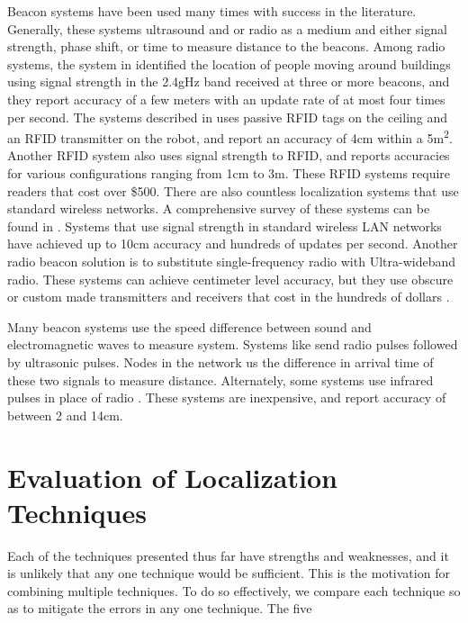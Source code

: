 \documentclass{article}
\begin{document}
Beacon systems have been used many times with success in the literature. Generally, these systems ultrasound and or radio as a medium and either signal strength, phase shift, or time to measure distance to the beacons. Among radio systems, the system in \cite{bahl_radar:_2000} identified the location of people moving around buildings using signal strength in the 2.4gHz band received at three or more beacons, and they report accuracy of a few meters with an update rate of at most four times per second. The systems described in \cite{digiampaolo_mobile_2014} uses passive RFID tags on the ceiling and an RFID transmitter on the robot, and report an accuracy of 4\si{\centi\meter} within a 5\si{\square\meter}. Another RFID system \cite{saab_standalone_2011} also uses signal strength to RFID, and reports accuracies for various configurations ranging from 1\si{\centi\meter} to 3\si{\meter}. These RFID systems require readers that cost over \$500. There are also countless localization systems that use standard wireless networks. A comprehensive survey of these systems can be found in \cite{liu_survey_2007}. Systems that use signal strength in standard wireless LAN networks have achieved up to 10\si{\centi\meter} accuracy and hundreds of updates per second. Another radio beacon solution is to substitute single-frequency radio with Ultra-wideband radio. These systems can achieve centimeter level accuracy, but they use obscure or custom made transmitters and receivers that cost in the hundreds of dollars \cite{noauthor_dart_nodate} \cite{noauthor_pozyx_nodate}.

Many beacon systems use the speed difference between sound and electromagnetic waves to measure system. Systems like \cite{smith_tracking_2004} \cite{ward_new_1997} \cite{kim_advanced_2008} send radio pulses followed by ultrasonic pulses. Nodes in the network us the difference in arrival time of these two signals to measure distance. Alternately, some systems use infrared pulses in place of radio \cite{ghidary_new_1999} \cite{yucel_development_2012}. These systems are inexpensive, and report accuracy of between 2 and 14\si{\centi\meter}.

\section{Evaluation of Localization Techniques} \label{methods}

Each of the techniques presented thus far have strengths and weaknesses, and it is unlikely that any one technique would be sufficient. This is the motivation for combining multiple techniques. To do so effectively, we compare each technique so as to mitigate the errors in any one technique. The five
\end{document}
